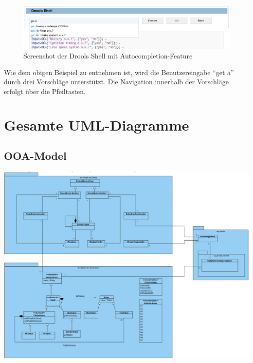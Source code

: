 \documentclass[a4paper,12pt]{report}
\begin{document}
  \begin{figure}[htbp]
    \centering
      \includegraphics[width=\textwidth]{img/shell-autocomplete.png}
    \caption{Screenshot der Drools Shell mit Autocompletion-Feature}
  \end{figure}
  
  Wie dem obigen Beispiel zu entnehmen ist, wird die Benutzereingabe "`get a"' durch drei Vorschläge unterstützt. 
  Die Navigation innerhalb der Vorschläge erfolgt über die Pfeiltasten.

  \appendix
  
  \chapter{Gesamte UML-Diagramme}
  \section{OOA-Model}
  
  \includegraphics[width=\textwidth]{img/ooa.png}
\end{document}

